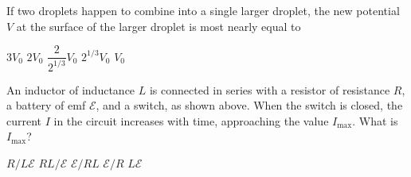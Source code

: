 \documentclass[12pt]{../../../oss-classkick-exam}
\begin{document}
\begin{questions}
  \question If two droplets happen to combine into a single larger droplet, the
  new potential $V$ at the surface of the larger droplet is most nearly equal to
  \label{rain2}
  \begin{choices}
    \choice $3V_0$
    \choice $2V_0$
    \choice $\dfrac2{2^{1/3}}V_0$
    \choice $2^{1/3}V_0$
    \choice $V_0$
  \end{choices}
  
%
%  
  \uplevel{ \rule{\linewidth}{.5pt}}
  
  \question An inductor of inductance $L$ is connected in series with a
  resistor of resistance $R$, a battery of emf $\mathcal E$, and a switch, as
  shown above. When the switch is closed, the current $I$ in the circuit
  increases with time, approaching the value $I_\text{max}$. What is
  $I_\text{max}$?
  
  \begin{minipage}{.4\textwidth}
  \end{minipage}
  \begin{minipage}{.4\linewidth}
    \begin{choices}
      \choice $R/L\mathcal E$
      \choice $RL/\mathcal E$
      \choice $\mathcal E/RL$
      \choice $\mathcal E/R$
      \choice $L\mathcal E$
    \end{choices}
  \end{minipage}
  \newpage  
  

\end{questions}
\end{document}
